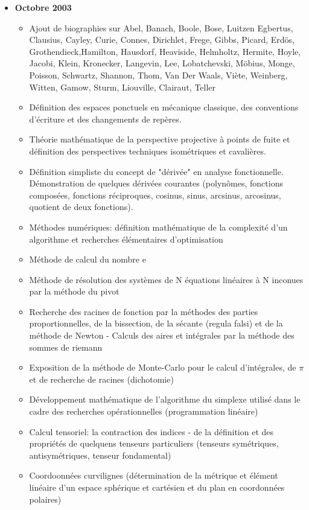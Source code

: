 \begin{itemize}
		\item \textbf{Octobre 2003}
			\begin{itemize}[noitemsep]
				\item Ajout de biographies sur Abel, Banach, Boole, Bose, Luitzen Egbertus, Clausius, Cayley, Curie, Connes, Dirichlet, Frege, Gibbs, Picard, Erdös, Grothendieck,Hamilton, Hausdorf, Heaviside, Helmholtz, Hermite, Hoyle, Jacobi, Klein, Kronecker, Langevin, Lee, Lobatchevski, Möbius, Monge, Poisson, Schwartz, Shannon, Thom, Van Der Waals, Viète, Weinberg, Witten, Gamow, Sturm, Liouville, Clairaut, Teller
				\item Définition des espaces ponctuels en mécanique classique, des conventions d'écriture et des changements de repères.
				\item Théorie mathématique de la perspective projective à points de fuite et définition des perspectives techniques isométriques et cavalières.
				\item Définition simpliste du concept de "dérivée" en analyse fonctionnelle. Démonstration de quelques dérivées courantes (polynômes, fonctions composées, fonctions réciproques, cosinus, sinus, arcsinus, arcosinus, quotient de deux fonctions).
				\item Méthodes numériques: définition mathématique de la complexité d'un algorithme et recherches élémentaires d'optimisation
				\item Méthode de calcul du nombre e
				\item Méthode de résolution des systèmes de N équations linéaires à N inconues par la méthode du pivot 
				\item Recherche des racines de fonction par la méthodes des parties proportionnelles, de la bissection, de la sécante (regula falsi) et de la méthode de Newton - Calculs des aires et intégrales par la méthode des sommes de riemann 
				\item Exposition de la méthode de Monte-Carlo pour le calcul d'intégrales, de $\pi$ et de recherche de racines (dichotomie) 
				\item Développement mathématique de l'algorithme du simplexe utilisé dans le cadre des recherches opérationnelles (programmation linéaire) 
				\item Calcul tensoriel: la contraction des indices - de la définition et des propriétés de quelquens tenseurs particuliers (tenseurs symétriques, antisymétriques, tenseur fondamental) 
				\item Coordoonnées curvilignes (détermination de la métrique et élément linéaire d'un espace sphérique et cartésien et du plan en coordonnées polaires) 

\end{itemize}
\end{itemize}
